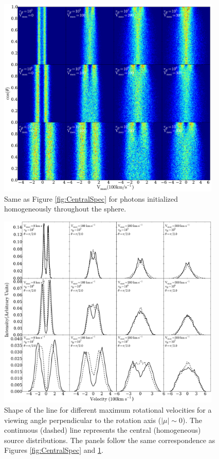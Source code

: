 \documentclass{emulateapj}
\newcommand{\ly}{{\ifmmode{{\rm Ly}\alpha~}\else{Ly$\alpha$~}\fi}}
\begin{document}
\begin{figure}
\begin{center}
  \includegraphics[width=0.95\textwidth]{f3.pdf}
\end{center}
\caption{Same as Figure \ref{fig:CentralSpec} for \ly photons
  initialized homogeneously throughout the sphere.
    \label{fig:HomSpec}}  
\end{figure}

\begin{figure}
\begin{center}
  \includegraphics[width=0.95\textwidth]{f4.pdf}
\end{center}
\caption{Shape of the \ly line for different maximum rotational
  velocities for a viewing angle perpendicular to the rotation axis
  ($|\mu|\sim 0$). The continuous (dashed) line represents the central
  (homogeneous) source distributions.  The panels follow the same
  correspondence as Figures \ref{fig:CentralSpec} and \ref{fig:HomSpec}.
    \label{fig:differentvelocities}}  
\end{figure}
\end{document}
